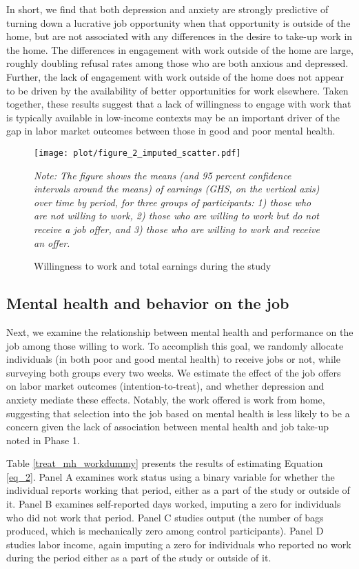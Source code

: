 \documentclass[12pt, a4paper, american]{article}
\begin{document}
In short, we find that both depression and anxiety are strongly predictive of turning down a lucrative job opportunity when that opportunity is outside of the home, but are not associated with any differences in the desire to take-up work in the home. The differences in engagement with work outside of the home are large, roughly doubling refusal rates among those who are both anxious and depressed. Further, the lack of engagement with work outside of the home does not appear to be driven by the availability of better opportunities for work elsewhere. Taken together, these results suggest that a lack of willingness to engage with work that is typically available in low-income contexts may be an important driver of the gap in labor market outcomes between those in good and poor mental health. 

\begin{figure}[H]
    \centering
    \texttt{[image: plot/figure\_2\_imputed\_scatter.pdf]}
    \caption{Willingness to work and total earnings during the study}\label{vip_earnings_sign_up}
    \flushleft
        \textit{Note: The figure shows the means (and 95 percent confidence intervals around the means) of earnings (GHS, on the vertical axis) over time by period, for three groups of participants: 1) those who are not willing to work, 2) those who are willing to work but do not receive a job offer, and 3) those who are willing to work and receive an offer.}
  \end{figure}


\subsection{Mental health and behavior on the job}
Next, we examine the relationship between mental health and performance on the job among those willing to work. To accomplish this goal, we randomly allocate individuals (in both poor and good mental health) to receive jobs or not, while surveying both groups every two weeks. We estimate the effect of the job offers on labor market outcomes (intention-to-treat), and whether depression and anxiety mediate these effects. Notably, the work offered is work from home, suggesting that selection into the job based on mental health is less likely to be a concern given the lack of association between mental health and job take-up noted in Phase 1. 


Table \ref{treat_mh_workdummy} presents the results of estimating Equation \ref{eq_2}. Panel A examines work status using a binary variable for whether the individual reports working that period, either as a part of the study or outside of it. Panel B examines self-reported days worked, imputing a zero for individuals who did not work that period. Panel C studies output (the number of bags produced, which is mechanically zero among control participants). Panel D studies labor income, again imputing a zero for individuals who reported no work during the period either as a part of the study or outside of it. 
\end{document}
